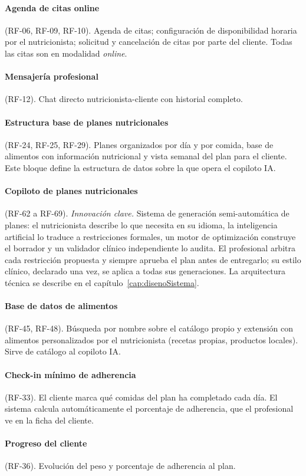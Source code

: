 \paragraph{Agenda de citas online} (RF-06, RF-09, RF-10). Agenda de citas; configuración de disponibilidad horaria por el nutricionista; solicitud y cancelación de citas por parte del cliente. Todas las citas son en modalidad \textit{online}.

\paragraph{Mensajería profesional} (RF-12). Chat directo nutricionista-cliente con historial completo.

\paragraph{Estructura base de planes nutricionales} (RF-24, RF-25, RF-29). Planes organizados por día y por comida, base de alimentos con información nutricional y vista semanal del plan para el cliente. Este bloque define la estructura de datos sobre la que opera el copiloto IA.

\paragraph{Copiloto de planes nutricionales} (RF-62 a RF-69). \textit{Innovación clave.} Sistema de generación semi-automática de planes: el nutricionista describe lo que necesita en su idioma, la inteligencia artificial lo traduce a restricciones formales, un motor de optimización construye el borrador y un validador clínico independiente lo audita. El profesional arbitra cada restricción propuesta y siempre aprueba el plan antes de entregarlo; su estilo clínico, declarado una vez, se aplica a todas sus generaciones. La arquitectura técnica se describe en el capítulo~\ref{cap:disenoSistema}.

\paragraph{Base de datos de alimentos} (RF-45, RF-48). Búsqueda por nombre sobre el catálogo propio y extensión con alimentos personalizados por el nutricionista (recetas propias, productos locales). Sirve de catálogo al copiloto IA.

\paragraph{Check-in mínimo de adherencia} (RF-33). El cliente marca qué comidas del plan ha completado cada día. El sistema calcula automáticamente el porcentaje de adherencia, que el profesional ve en la ficha del cliente.

\paragraph{Progreso del cliente} (RF-36). Evolución del peso y porcentaje de adherencia al plan.


